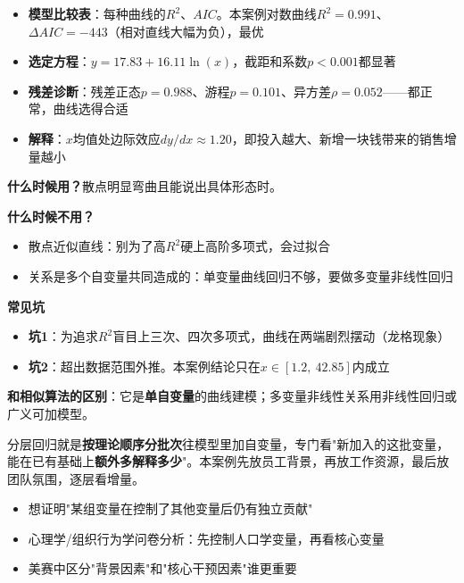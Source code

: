 \begin{algoresult}
\begin{itemize}
    \item \textbf{模型比较表}：每种曲线的$R^2$、$AIC$。本案例对数曲线$R^2=0.991$、$\Delta AIC=-443$（相对直线大幅为负），最优
    \item \textbf{选定方程}：$y=17.83+16.11\ln(x)$，截距和系数$p<0.001$都显著
    \item \textbf{残差诊断}：残差正态$p=0.988$、游程$p=0.101$、异方差$\rho=0.052$——都正常，曲线选得合适
    \item \textbf{解释}：$x$均值处边际效应$dy/dx\approx1.20$，即投入越大、新增一块钱带来的销售增量越小
\end{itemize}
\end{algoresult}

\begin{algonotes}
\textbf{什么时候用？}散点明显弯曲且能说出具体形态时。

\textbf{什么时候不用？}
\begin{itemize}
    \item 散点近似直线：别为了高$R^2$硬上高阶多项式，会过拟合
    \item 关系是多个自变量共同造成的：单变量曲线回归不够，要做多变量非线性回归
\end{itemize}

\textbf{常见坑}
\begin{itemize}
    \item \textbf{坑1}：为追求$R^2$盲目上三次、四次多项式，曲线在两端剧烈摆动（龙格现象）
    \item \textbf{坑2}：超出数据范围外推。本案例结论只在$x\in[1.2,\ 42.85]$内成立
\end{itemize}

\textbf{和相似算法的区别}：它是\textbf{单自变量}的曲线建模；多变量非线性关系用非线性回归或广义可加模型。
\end{algonotes}


\begin{algointro}
分层回归就是\textbf{按理论顺序分批次}往模型里加自变量，专门看"新加入的这批变量，能在已有基础上\textbf{额外多解释多少}"。本案例先放员工背景，再放工作资源，最后放团队氛围，逐层看增量。
\end{algointro}

\begin{algoscene}
\begin{itemize}
    \item 想证明"某组变量在控制了其他变量后仍有独立贡献"
    \item 心理学/组织行为学问卷分析：先控制人口学变量，再看核心变量
    \item 美赛中区分"背景因素"和"核心干预因素"谁更重要
\end{itemize}
\end{algoscene}

